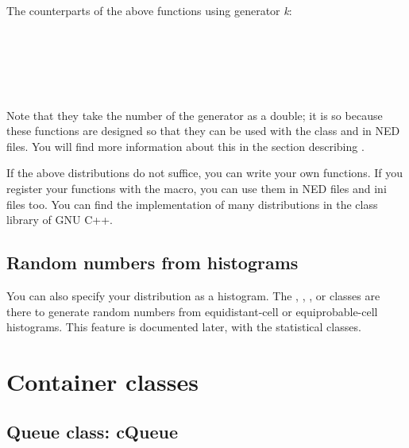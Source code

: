 The counterparts of the above functions using generator \textit{k}:

\\
\\
\\
\\
\\


Note that they take the number of the generator as a double; 
it is so because these functions are designed so that they can 
be used with the  class and in NED files. You will find more 
information about this in the section describing .

If the above distributions do not suffice, you can write your own
functions. If you register your functions
with the  macro, you can use them in NED
files and ini files too. You can find the implementation of many
distributions in the class library of GNU C++.





\subsection{Random numbers from histograms}

You can also specify your distribution as a
histogram. The
, ,
,  or  classes
are there to generate random numbers from equi\-dis\-tant-cell or
equiprobable-cell histograms.  This feature is documented later, with
the statistical classes.





\section{Container classes}

\subsection{Queue class: cQueue}

